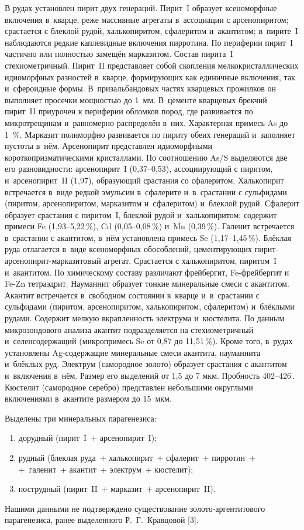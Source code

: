 В рудах установлен пирит двух генераций. Пирит~I образует ксеноморфные включения в~кварце, реже массивные агрегаты в~ассоциации с арсенопиритом; срастается с блеклой рудой, халькопиритом, сфалеритом и~акантитом; в~пирите~I наблюдаются редкие каплевидные включения пирротина. По периферии пирит~I частично или полностью замещён марказитом. Состав пирита~I стехиометричный. Пирит~II представляет собой скопления мелкокристаллических идиоморфных разностей в~кварце, формирующих как единичные включения, так и~сфероидные формы. В~призальбандовых частях кварцевых прожилков он выполняет просечки мощностью до 1~мм. В~цементе кварцевых брекчий пирит~II приурочен к периферии обломков пород, где развивается по микротрещинам и~равномерно распределён в~них. Характерная примесь As до 1~\%. Марказит полиморфно развивается по пириту обеих генераций и~заполняет пустоты в~нём. Арсенопирит представлен идиоморфными короткопризматическими кристаллами. По соотношению As/S выделяются две его разновидности: арсенопирит~I (0,37--0,53), ассоциирующий с пиритом, и~арсенопирит~II (1,97), образующий срастания со сфалеритом. Халькопирит встречается в~виде редкой эмульсии в~сфалерите и~в~срастании с сульфидами (пиритом, арсенопиритом, марказитом и~сфалеритом) и~блеклой рудой. Сфалерит образует срастания с пиритом~I, блеклой рудой и~халькопиритом; содержит примеси Fe (1,93--5,22\,\%), Cd (0,05--0,08\,\%) и~Mn (0,39\,\%). Галенит встречается в~срастании с акантитом, в~нём установлена примесь Se (1,17--1,45\,\%). Блёклая руда отлагается в~виде ксеноморфных обособлений, цементирующих пирит-арсенопирит-марказитовый агрегат. Срастается с халькопиритом, пиритом~I и~акантитом. По химическому составу различают фрейбергит, Fe-фрейбергит и Fe-Zn тетраэдрит. Науманнит образует тонкие минеральные смеси с акантитом. Акантит встречается в~свободном состоянии в~кварце и~в~срастании с сульфидами (пиритом, арсенопиритом, халькопиритом, сфалеритом) и~блёклыми рудами. Содержит мелкую вкрапленность электрума и~кюстелита. По данным микрозондового анализа акантит подразделяется на стехиометричный и~селенсодержащий (микропримесь Se от 0,87 до 11,51\,\%). Кроме того, в~рудах установлены Ag-содержащие минеральные смеси акантита, науманнита и~блёклых руд. Электрум (самородное золото) образует срастания с акантитом и~включения в~нём. Размер его выделений от 1,5 до 7 мкм. Пробность 402--426\,\permil. Кюстелит (самородное серебро) представлен небольшими округлыми включениями в~акантите размером до 15~мкм.

Выделены три минеральных парагенезиса:
\begin{enumerate}[noitemsep]\vspace{-6pt}
  \item дорудный (пирит~I~+ арсенопирит~I);
  \item рудный (блеклая руда~+ халькопирит~+ сфалерит~+ пирротин~+\\+~галенит~+ акантит~+ электрум~+ кюстелит);
  \item пострудный (пирит~II~+ марказит~+ арсенопирит~II).
\end{enumerate}
 \vspace{-6pt}Нашими данными не подтверждено существование золото-аргентитового парагенезиса, ранее выделенного Р.~Г.~Кравцовой [3].

